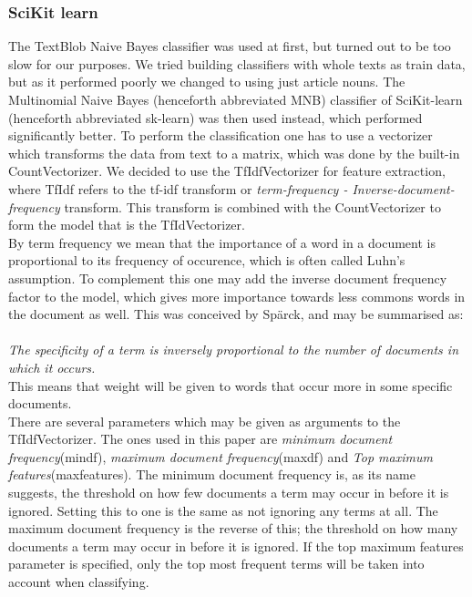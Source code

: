 \documentclass[a4paper,10pt]{article}
\begin{document}
\subsubsection{SciKit learn} 

\label{sec:sklearn}
The TextBlob Naive Bayes classifier was used at first, but turned out to be too slow for our purposes. We tried building classifiers with whole texts as train data, but as it performed poorly we changed to using just article nouns. The Multinomial Naive Bayes (henceforth abbreviated MNB) classifier of SciKit-learn (henceforth abbreviated sk-learn) was then used instead, which performed significantly better. To perform the classification one has to use a vectorizer which transforms the data from text to a matrix, which was done by the built-in CountVectorizer. We decided to use the TfIdfVectorizer for feature extraction, where TfIdf refers to the tf-idf transform or \textit{term-frequency - Inverse-document-frequency} transform\cite{skfeatures}. This transform is combined with the CountVectorizer to form the model that is the TfIdVectorizer.\\

\noindent By term frequency we mean that the importance of a word in a document is proportional to its frequency of occurence, which is often called Luhn's assumption\cite{luhn}. To complement this one may add the inverse document frequency factor to the model, which gives more importance towards less commons words in the document as well. This was conceived by Spärck\cite{sparck}, and may be summarised as:\\
\\
\textit{The specificity of a term is inversely proportional to the number of documents in which it occurs.} \\

\noindent This means that weight will be given to words that occur more in some specific documents.\\

\noindent There are several parameters which may be given as arguments to the TfIdfVectorizer. The ones used in this paper are \textit{minimum document frequency}(min\textunderscore df), \textit{maximum document frequency}(max\textunderscore df) and \textit{Top maximum features}(max\textunderscore features).
The minimum document frequency is, as its name suggests, the threshold on how few documents a term may occur in before it is ignored. Setting this to one is the same as not ignoring any terms at all.
The maximum document frequency is the reverse of this; the threshold on how many documents a term may occur in before it is ignored. If the top maximum features parameter is specified, only the top most frequent terms will be taken into account when classifying.
\end{document}
